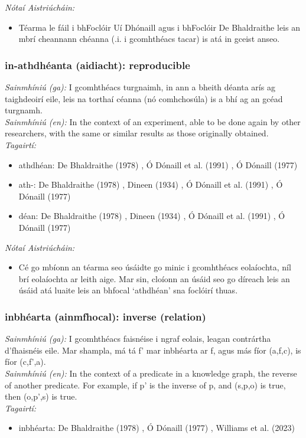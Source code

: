  \noindent \textit{Nótaí Aistriúcháin:}
\begin{itemize}
	\item Téarma le fáil i bhFoclóir Uí Dhónaill agus i bhFoclóir De Bhaldraithe leis an mbrí cheannann chéanna (.i. i gcomhthéacs tacar) is atá in gceist anseo.
\end{itemize}


\subsubsection*{in-athdhéanta (aidiacht): reproducible}
 \noindent \textit{Sainmhíniú (ga):} I gcomhthéacs turgnaimh, in ann a bheith déanta arís ag taighdeoirí eile, leis na torthaí céanna (nó comhchosúla) is a bhí ag an gcéad turgnamh.
\\
 \noindent \textit{Sainmhíniú (en):} In the context of an experiment, able to be done again by other researchers, with the same or similar results as those originally obtained.
\\
 \noindent \textit{Tagairtí:}
\begin{itemize}
	\item athdhéan: De Bhaldraithe (1978) \cite{de-bhaldraithe}, Ó Dónaill et al. (1991) \cite{focloir-beag}, Ó Dónaill (1977) \cite{odonaill}
	\item ath-: De Bhaldraithe (1978) \cite{de-bhaldraithe}, Dineen (1934) \cite{dineen}, Ó Dónaill et al. (1991) \cite{focloir-beag}, Ó Dónaill (1977) \cite{odonaill}
	\item déan: De Bhaldraithe (1978) \cite{de-bhaldraithe}, Dineen (1934) \cite{dineen}, Ó Dónaill et al. (1991) \cite{focloir-beag}, Ó Dónaill (1977) \cite{odonaill}
\end{itemize}

 \noindent \textit{Nótaí Aistriúcháin:}
\begin{itemize}
	\item Cé go mbíonn an téarma seo úsáidte go minic i gcomhthéacs eolaíochta, níl brí eolaíochta ar leith aige. Mar sin, cloíonn an úsáid seo go díreach leis an úsáid atá luaite leis an bhfocal `athdhéan' sna foclóirí thuas.
\end{itemize}


\subsubsection*{inbhéarta (ainmfhocal): inverse (relation)}
 \noindent \textit{Sainmhíniú (ga):} I gcomhthéacs faisnéise i ngraf eolais, leagan contrártha d'fhaisnéis eile. Mar shampla, má tá f' mar inbhéarta ar f, agus más fíor (a,f,c), is fíor (c,f',a).
\\
 \noindent \textit{Sainmhíniú (en):} In the context of a predicate in a knowledge graph, the reverse of another predicate. For example, if p' is the inverse of p, and (s,p,o) is true, then (o,p',s) is true.
\\
 \noindent \textit{Tagairtí:}
\begin{itemize}
	\item inbhéarta: De Bhaldraithe (1978) \cite{de-bhaldraithe}, Ó Dónaill (1977) \cite{odonaill}, Williams et al. (2023) \cite{storchiste}
\end{itemize}

